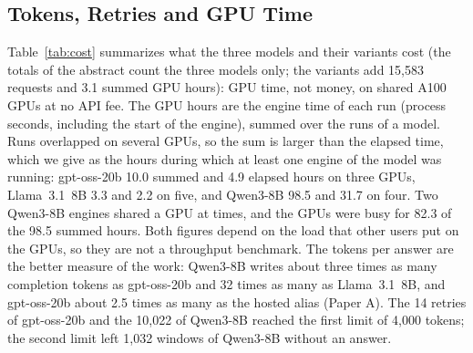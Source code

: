 \subsection{Tokens, Retries and GPU Time}
\label{sec:results:cost}

Table~\ref{tab:cost} summarizes what the three models and their variants cost (the totals of the abstract count the three models only; the variants add 15{,}583 requests and 3.1 summed GPU hours): GPU time, not money, on shared A100 GPUs at no API fee. The GPU hours are the engine time of each run (process seconds, including the start of the engine), summed over the runs of a model. Runs overlapped on several GPUs, so the sum is larger than the elapsed time, which we give as the hours during which at least one engine of the model was running: gpt-oss-20b 10.0 summed and 4.9 elapsed hours on three GPUs, Llama~3.1~8B 3.3 and 2.2 on five, and Qwen3-8B 98.5 and 31.7 on four. Two Qwen3-8B engines shared a GPU at times, and the GPUs were busy for 82.3 of the 98.5 summed hours. Both figures depend on the load that other users put on the GPUs, so they are not a throughput benchmark. The tokens per answer are the better measure of the work: Qwen3-8B writes about three times as many completion tokens as gpt-oss-20b and 32 times as many as Llama~3.1~8B, and gpt-oss-20b about 2.5 times as many as the hosted alias (Paper A). The 14 retries of gpt-oss-20b and the 10{,}022 of Qwen3-8B reached the first limit of 4{,}000 tokens; the second limit left 1{,}032 windows of Qwen3-8B without an answer.

